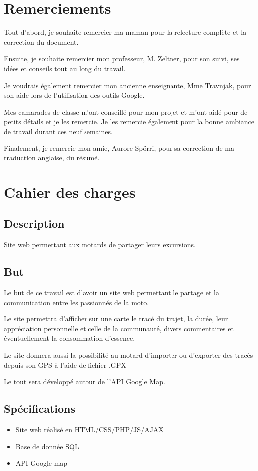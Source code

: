 \documentclass[a4paper]{article}
\begin{document}
\section{Remerciements}
Tout d'abord, je souhaite remercier ma maman pour la relecture complète et la correction du document.

Ensuite, je souhaite remercier mon professeur, M. Zeltner, pour son suivi, ses idées et conseils tout au long du travail.

Je voudrais également remercier mon ancienne enseignante, Mme Travnjak, pour son aide lors de l'utilisation des outils Google.

Mes camarades de classe m'ont conseillé pour mon projet et m'ont aidé pour de petits détails et je les remercie. Je les remercie également pour la bonne ambiance de travail durant ces neuf semaines.

Finalement, je remercie mon amie, Aurore Spörri, pour sa correction de ma traduction anglaise, du résumé.
\newpage
\section{Cahier des charges}

\subsection{Description}
Site web permettant aux motards de partager leurs excursions. 

\subsection{But}
Le but de ce travail est d'avoir un site web permettant le partage et la communication entre les passionnés de la moto.

Le site permettra d'afficher sur une carte le tracé du trajet, la durée, leur appréciation personnelle et celle de la communauté, divers commentaires et éventuellement la consommation d'essence.

Le site donnera aussi la possibilité au motard d'importer ou d'exporter des tracés depuis son GPS à l'aide de fichier .GPX

Le tout sera développé autour de l'API Google Map.

\subsection{Spécifications}

\begin{itemize}
	\item Site web réalisé en HTML/CSS/PHP/JS/AJAX
	\item Base de donnée SQL
	\item API Google map
\end{itemize}
\end{document}

